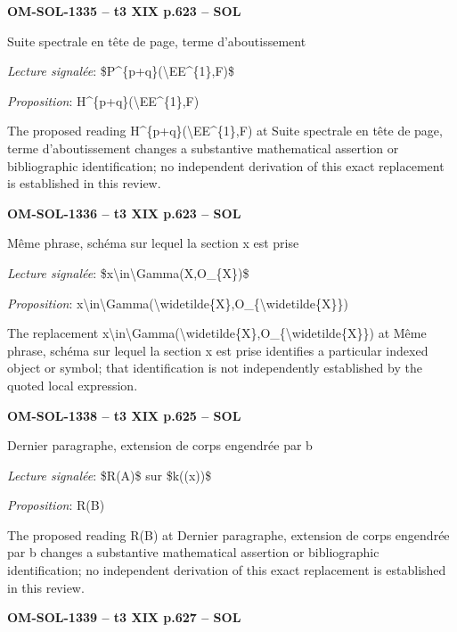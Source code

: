\par\noindent\textbf{OM-SOL-1335 -- t3 XIX p.623 -- SOL}\par
Suite spectrale en tête de page, terme d'aboutissement\par
\emph{Lecture signalée}: \$P\textasciicircum{}\{p+q\}(\textbackslash{}EE\textasciicircum{}\{1\},F)\$\par
\emph{Proposition}: H\textasciicircum{}\{p+q\}(\textbackslash{}EE\textasciicircum{}\{1\},F)\par
The proposed reading H\textasciicircum{}\{p+q\}(\textbackslash{}EE\textasciicircum{}\{1\},F) at Suite spectrale en tête de page, terme d'aboutissement changes a substantive mathematical assertion or bibliographic identification; no independent derivation of this exact replacement is established in this review.\par
\par\noindent\textbf{OM-SOL-1336 -- t3 XIX p.623 -- SOL}\par
Même phrase, schéma sur lequel la section x est prise\par
\emph{Lecture signalée}: \$x\textbackslash{}in\textbackslash{}Gamma(X,O\_\{X\})\$\par
\emph{Proposition}: x\textbackslash{}in\textbackslash{}Gamma(\textbackslash{}widetilde\{X\},O\_\{\textbackslash{}widetilde\{X\}\})\par
The replacement x\textbackslash{}in\textbackslash{}Gamma(\textbackslash{}widetilde\{X\},O\_\{\textbackslash{}widetilde\{X\}\}) at Même phrase, schéma sur lequel la section x est prise identifies a particular indexed object or symbol; that identification is not independently established by the quoted local expression.\par
\par\noindent\textbf{OM-SOL-1338 -- t3 XIX p.625 -- SOL}\par
Dernier paragraphe, extension de corps engendrée par b\par
\emph{Lecture signalée}: \$R(A)\$ sur \$k((x))\$\par
\emph{Proposition}: R(B)\par
The proposed reading R(B) at Dernier paragraphe, extension de corps engendrée par b changes a substantive mathematical assertion or bibliographic identification; no independent derivation of this exact replacement is established in this review.\par
\par\noindent\textbf{OM-SOL-1339 -- t3 XIX p.627 -- SOL}\par
